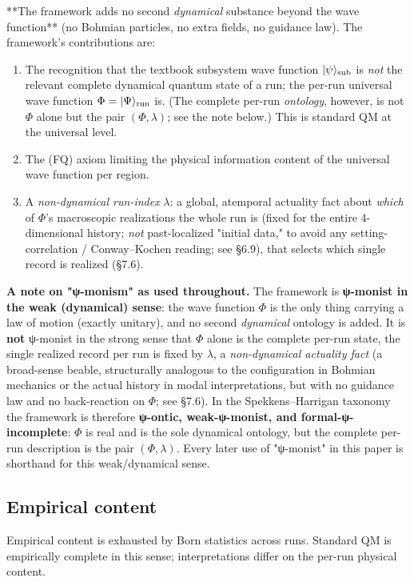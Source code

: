 \documentclass[11pt,a4paper]{article}
\begin{document}
**The framework adds no second \emph{dynamical} substance beyond the wave function** (no Bohmian particles, no extra fields, no guidance law). The framework's contributions are:
\begin{enumerate}
  \item The recognition that the textbook subsystem wave function $|\psi\rangle_{\rm sub}$ is \emph{not} the relevant complete dynamical quantum state of a run; the per-run universal wave function $\Phi = |\Psi\rangle_{\rm run}$ is. (The complete per-run \emph{ontology}, however, is not $\Phi$ alone but the pair $(\Phi, \lambda)$; see the note below.) This is standard QM at the universal level.
  \item The (FQ) axiom limiting the physical information content of the universal wave function per region.
  \item A \emph{non-dynamical run-index} $\lambda$: a global, atemporal actuality fact about \emph{which} of $\Phi$'s macroscopic realizations the whole run is (fixed for the entire 4-dimensional history; \emph{not} past-localized "initial data," to avoid any setting-correlation / Conway–Kochen reading; see §6.9), that selects which single record is realized (§7.6).
\end{enumerate}

\textbf{A note on "ψ-monism" as used throughout.} The framework is \textbf{ψ-monist in the weak (dynamical) sense}: the wave function $\Phi$ is the only thing carrying a law of motion (exactly unitary), and no second \emph{dynamical} ontology is added. It is \textbf{not} ψ-monist in the strong sense that $\Phi$ alone is the complete per-run state, the single realized record per run is fixed by $\lambda$, a \emph{non-dynamical actuality fact} (a broad-sense beable, structurally analogous to the configuration in Bohmian mechanics or the actual history in modal interpretations, but with no guidance law and no back-reaction on $\Phi$; see §7.6). In the Spekkens–Harrigan taxonomy the framework is therefore \textbf{ψ-ontic, weak-ψ-monist, and formal-ψ-incomplete}: $\Phi$ is real and is the sole dynamical ontology, but the complete per-run description is the pair $(\Phi, \lambda)$. Every later use of "ψ-monist" in this paper is shorthand for this weak/dynamical sense.

\subsection{Empirical content}

Empirical content is exhausted by Born statistics across runs. Standard QM is empirically complete in this sense; interpretations differ on the per-run physical content.
\end{document}
